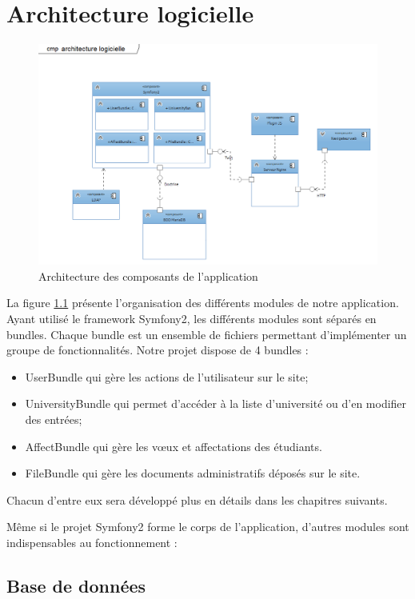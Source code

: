 \chapter{Architecture logicielle}

\begin{figure}
	\includegraphics[scale=0.8,angle=90]{images/archilogi.png}
	\caption{Architecture des composants de l'application}
	\label{archilogi}
\end{figure}

La figure \ref{archilogi} présente l'organisation des différents modules de notre application. 
\bigbreak
Ayant utilisé le framework Symfony2, les différents modules sont séparés en bundles. Chaque bundle est un ensemble de fichiers permettant d'implémenter un groupe de fonctionnalités. Notre projet dispose de 4 bundles :
\begin{itemize}
	\item UserBundle qui gère les actions de l'utilisateur sur le site;
	\item UniversityBundle qui permet d'accéder à la liste d'université ou d'en modifier des entrées;
	\item AffectBundle qui gère les vœux et affectations des étudiants.
	\item FileBundle qui gère les documents administratifs déposés sur le site.
\end{itemize}
Chacun d'entre eux sera développé plus en détails dans les chapitres suivants.
\bigbreak

Même si le projet Symfony2 forme le corps de l'application,  d'autres modules sont indispensables au fonctionnement :
 
\section{Base de données}

